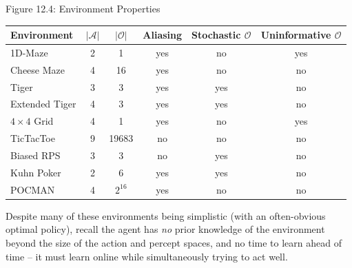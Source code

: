 \documentclass[aspectratio=169,10pt]{beamer}
\newcommand{\Acal}{\mathcal{A}}
\newcommand{\Ocal}{\mathcal{O}}
\begin{document}
\begin{frame}{Figure 12.4: Environment Properties}
\begin{center}
\small
\begin{tabular}{lccccc}
\toprule
\textbf{Environment} & $|\Acal|$ & $|\Ocal|$ & Aliasing & Stochastic $\Ocal$ & Uninformative $\Ocal$\\
\midrule
1D-Maze         & 2 & 1     & yes & no  & yes\\
Cheese Maze     & 4 & 16    & yes & no  & no\\
Tiger           & 3 & 3     & yes & yes & no\\
Extended Tiger  & 4 & 3     & yes & yes & no\\
$4\times4$ Grid & 4 & 1     & yes & no  & yes\\
TicTacToe       & 9 & 19683 & no  & no  & no\\
Biased RPS      & 3 & 3     & no  & yes & no\\
Kuhn Poker      & 2 & 6     & yes & yes & no\\
POCMAN          & 4 & $2^{16}$ & yes & no & no\\
\bottomrule
\end{tabular}
\end{center}
\vspace{0.3cm}
Despite many of these environments being simplistic (with an often-obvious optimal
policy), recall the agent has \emph{no} prior knowledge of the environment beyond the
size of the action and percept spaces, and no time to learn ahead of time -- it must learn
online while simultaneously trying to act well.
\end{frame}
\end{document}
